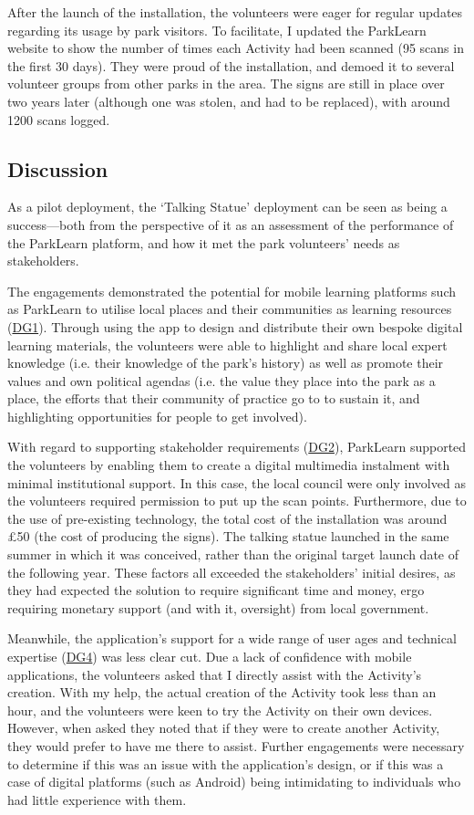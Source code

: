 After the launch of the installation, the volunteers were eager for regular updates regarding its usage by park visitors. To facilitate, I updated the ParkLearn website to show the number of times each Activity had been scanned (95 scans in the first 30 days). They were proud of the installation, and demoed it to several volunteer groups from other parks in the area. The signs are still in place over two years later (although one was stolen, and had to be replaced), with around 1200 scans logged.

\subsection{Discussion}

As a pilot deployment, the `Talking Statue' deployment can be seen as being a success---both from the perspective of it as an assessment of the performance of the ParkLearn platform, and how it met the park volunteers' needs as stakeholders.

The engagements demonstrated the potential for mobile learning platforms such as ParkLearn to utilise local places and their communities as learning resources (\hyperref[DG1]{DG1}). Through using the app to design and distribute their own bespoke digital learning materials, the volunteers were able to highlight and share local expert knowledge (i.e. their knowledge of the park's history) as well as promote their values and own political agendas (i.e. the value they place into the park as a place, the efforts that their community of practice go to to sustain it, and highlighting opportunities for people to get involved).

With regard to supporting stakeholder requirements (\hyperref[DG2]{DG2}), ParkLearn supported the volunteers by enabling them to create a digital multimedia instalment with minimal institutional support. In this case, the local council were only involved as the volunteers required permission to put up the scan points. Furthermore, due to the use of pre-existing technology, the total cost of the installation was around £50 (the cost of producing the signs). The talking statue launched in the same summer in which it was conceived, rather than the original target launch date of the following year. These factors all exceeded the stakeholders' initial desires, as they had expected the solution to require significant time and money, ergo requiring monetary support (and with it, oversight) from local government.

Meanwhile, the application's support for a wide range of user ages and technical expertise (\hyperref[DG4]{DG4}) was less clear cut. Due a lack of confidence with mobile applications, the volunteers asked that I directly assist with the Activity's creation. With my help, the actual creation of the Activity took less than an hour, and the volunteers were keen to try the Activity on their own devices. However, when asked they noted that if they were to create another Activity, they would prefer to have me there to assist. Further engagements were necessary to determine if this was an issue with the application's design, or if this was a case of digital platforms (such as Android) being intimidating to individuals who had little experience with them.


